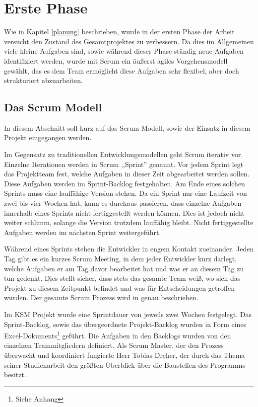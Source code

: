 \section{Erste Phase}

Wie in Kapitel \ref{planung} beschrieben, wurde in der ersten Phase der Arbeit versucht den Zustand des Gesamtprojektes zu verbessern. Da dies im Allgemeinen viele kleine Aufgaben sind, sowie während dieser Phase ständig neue Aufgaben identifiziert werden, wurde mit Scrum ein äußerst agiles Vorgehensmodell gewählt, das es dem Team ermöglicht diese Aufgaben sehr flexibel, aber doch strukturiert abzuarbeiten.

\subsection{Das Scrum Modell}

In diesem Abschnitt soll kurz auf das Scrum Modell, sowie der Einsatz in diesem Projekt eingegangen werden.

Im Gegensatz zu traditionellen Entwicklungsmodellen geht Scrum iterativ vor. Einzelne Iterationen werden in Scrum ,,Sprint'' genannt. Vor jedem Sprint legt das Projektteam fest, welche Aufgaben in dieser Zeit abgearbeitet werden sollen. Diese Aufgaben werden im Sprint-Backlog festgehalten. Am Ende eines solchen Sprints muss eine lauffähige Version stehen. Da ein Sprint nur eine Laufzeit von zwei bis vier Wochen hat, kann es durchaus passieren, dass einzelne Aufgaben innerhalb eines Sprints nicht fertiggestellt werden können. Dies ist jedoch nicht weiter schlimm, solange die Version trotzdem lauffähig bleibt. Nicht fertiggestellte Aufgaben werden im nächsten Sprint  weitergeführt. 

Während eines Sprints stehen die Entwickler in engem Kontakt zueinander. Jeden Tag gibt es ein kurzes Scrum Meeting, in dem jeder Entwickler kurz darlegt, welche Aufgaben er am Tag davor bearbeitet hat und was er an diesem Tag zu tun gedenkt. Dies stellt sicher, dass stets das gesamte Team weiß, wo sich das Projekt zu diesem Zeitpunkt befindet und was für Entscheidungen getroffen wurden. Der gesamte Scrum Prozess wird in \cite{bib:agil} genau beschrieben.

Im KSM Projekt wurde eine Sprintdauer von jeweils zwei Wochen festgelegt. Das Sprint-Backlog, sowie das übergeordnete Projekt-Backlog wurden in Form eines Excel-Do\-ku\-ments\footnote{Siehe Anhang} geführt. Die Aufgaben in den Backlogs wurden von den einzelnen Teammitgliedern definiert. Als Scrum Master, der den Prozess überwacht und koordiniert fungierte Herr Tobias Dreher, der durch das Thema seiner Studienarbeit den größten Überblick über die Baustellen des Programms besitzt.

